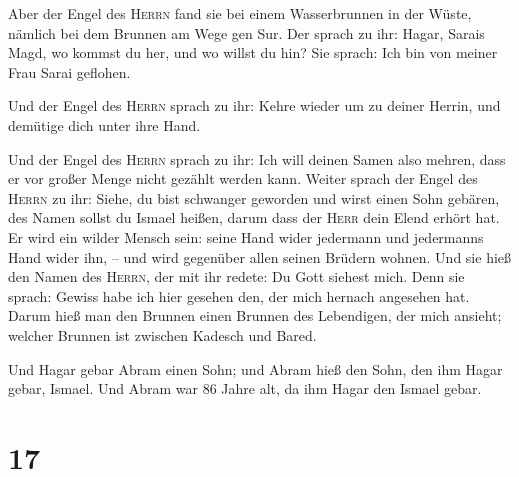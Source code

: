  Aber der Engel des \textsc{Herrn} fand sie bei einem
Wasserbrunnen in der Wüste, nämlich bei dem Brunnen am Wege gen Sur.
 Der sprach zu ihr: Hagar, Sarais Magd, wo kommst du her,
und wo willst du hin? Sie sprach: Ich bin von meiner Frau Sarai
geflohen.

 Und der Engel des \textsc{Herrn} sprach zu ihr: Kehre
wieder um zu deiner Herrin, und demütige dich unter ihre Hand.

 Und der Engel des \textsc{Herrn} sprach zu ihr: Ich will
deinen Samen also mehren, dass er vor großer Menge nicht gezählt werden
kann.  Weiter sprach der Engel des \textsc{Herrn} zu ihr:
Siehe, du bist schwanger geworden und wirst einen Sohn gebären, des
Namen sollst du Ismael heißen, darum dass der \textsc{Herr} dein Elend
erhört hat.  Er wird ein wilder Mensch sein: seine Hand
wider jedermann und jedermanns Hand wider ihn, -- und wird gegenüber
allen seinen Brüdern wohnen.  Und sie hieß den Namen des
\textsc{Herrn}, der mit ihr redete: Du Gott siehest mich. Denn sie
sprach: Gewiss habe ich hier gesehen den, der mich hernach angesehen
hat.  Darum hieß man den Brunnen einen Brunnen des
Lebendigen, der mich ansieht; welcher Brunnen ist zwischen Kadesch und
Bared.

 Und Hagar gebar Abram einen Sohn; und Abram hieß den
Sohn, den ihm Hagar gebar, Ismael.  Und Abram war 86
Jahre alt, da ihm Hagar den Ismael gebar.

\hypertarget{section-16}{%
\section{17}\label{section-16}}

